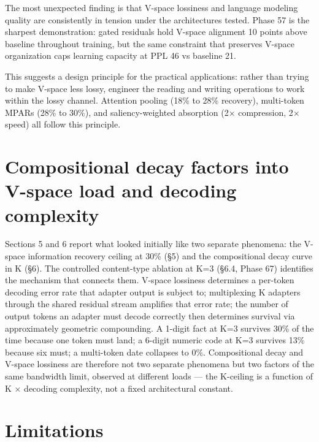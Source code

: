The most unexpected finding is that V-space lossiness and language modeling quality are consistently in tension under the architectures tested. Phase 57 is the sharpest demonstration: gated residuals hold V-space alignment 10 points above baseline throughout training, but the same constraint that preserves V-space organization caps learning capacity at PPL 46 vs baseline 21.

This suggests a design principle for the practical applications: rather than trying to make V-space less lossy, engineer the reading and writing operations to work within the lossy channel. Attention pooling (18\% to 28\% recovery), multi-token MPARs (28\% to 30\%), and saliency-weighted absorption (2× compression, 2× speed) all follow this principle.

\section{Compositional decay factors into V-space load and decoding complexity}\label{compositional-decay-factors-into-v-space-load-and-decoding-complexity}

Sections 5 and 6 report what looked initially like two separate phenomena: the V-space information recovery ceiling at 30\% (§5) and the compositional decay curve in K (§6). The controlled content-type ablation at K=3 (§6.4, Phase 67) identifies the mechanism that connects them. V-space lossiness determines a per-token decoding error rate that adapter output is subject to; multiplexing K adapters through the shared residual stream amplifies that error rate; the number of output tokens an adapter must decode correctly then determines survival via approximately geometric compounding. A 1-digit fact at K=3 survives 30\% of the time because one token must land; a 6-digit numeric code at K=3 survives 13\% because six must; a multi-token date collapses to 0\%. Compositional decay and V-space lossiness are therefore not two separate phenomena but two factors of the same bandwidth limit, observed at different loads --- the K-ceiling is a function of K × decoding complexity, not a fixed architectural constant.

\section{Limitations}\label{limitations}


